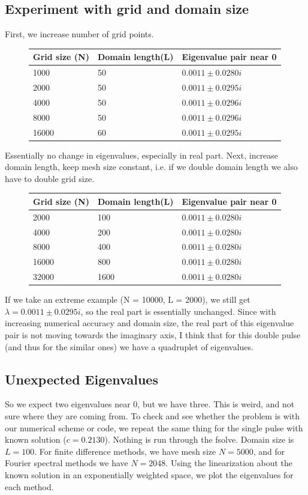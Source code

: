 \documentclass[12pt]{article}
\begin{document}
\subsection*{Experiment with grid and domain size}
First, we increase number of grid points.
\begin{figure}[H]
\begin{tabular}{l|l|l}
Grid size (N) & Domain length(L) & Eigenvalue pair near 0  \\ \hline
1000 &  50 & $0.0011 \pm 0.0280i$   \\
2000 &  50 & $0.0011 \pm 0.0295i$   \\
4000 &  50 & $0.0011 \pm 0.0296i$   \\
8000 &  50 & $0.0011 \pm 0.0296i$   \\
16000 & 60 & $0.0011 \pm 0.0295i$
\end{tabular}
\end{figure}
Essentially no change in eigenvalues, especially in real part. Next, increase domain length, keep mesh size constant, i.e. if we double domain length we also have to double grid size.
\begin{figure}[H]
\begin{tabular}{l|l|l}
Grid size (N) & Domain length(L) & Eigenvalue pair near 0  \\ \hline
2000 &  100 & $0.0011 \pm 0.0280i$ \\
4000 &  200 & $0.0011 \pm 0.0280i$ \\
8000 &  400 & $0.0011 \pm 0.0280i$ \\
16000&  800 & $0.0011 \pm 0.0280i$ \\
32000& 1600 & $0.0011 \pm 0.0280i$ \\
\end{tabular}
\end{figure}
If we take an extreme example (N = 10000, L = 2000), we still get $\lambda = 0.0011 \pm 0.0295i$, so the real part is essentially unchanged. Since with increasing numerical accuracy and domain size, the real part of this eigenvalue pair is not moving towards the imaginary axis, I think that for this double pulse (and thus for the similar ones) we have a quadruplet of eigenvalues.


\subsection*{Unexpected Eigenvalues}
So we expect two eigenvalues near 0, but we have three. This is weird, and not sure where they are coming from. To check and see whether the problem is with our numerical scheme or code, we repeat the same thing for the single pulse with known solution ($c =  0.2130$). Nothing is run through the fsolve. Domain size is $L = 100$. For finite difference methods, we have mesh size $N = 5000$, and for Fourier spectral methods we have $N = 2048$. 
Using the linearization about the known solution in an exponentially weighted space, we plot the eigenvalues for each method.
\end{document}

